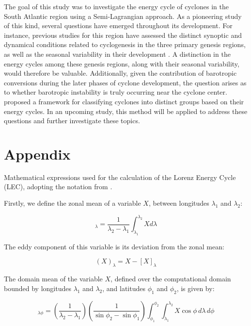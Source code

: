 \documentclass[pdflatex,sn-chicago]{sn-jnl}%
\theoremstyle{plain}
\theoremstyle{definition}
\theoremstyle{remark}
\theoremstyle{definition}
\begin{document}
The goal of this study was to investigate the energy cycle of cyclones in the South Atlantic region using a Semi-Lagrangian approach. As a pioneering study of this kind, several questions have emerged throughout its development. For instance, previous studies for this region have assessed the distinct synoptic and dynamical conditions related to cyclogenesis in the three primary genesis regions, as well as the seasonal variability in their development \citep{gramcianinov2019properties, crespo2021potential}. A distinction in the energy cycles among these genesis regions, along with their seasonal variability, would therefore be valuable. Additionally, given the contribution of barotropic conversions during the later phases of cyclone development, the question arises as to whether barotropic instability is truly occurring near the cyclone center. \citet{souza2024thesis} proposed a framework for classifying cyclones into distinct groups based on their energy cycles. In an upcoming study, this method will be applied to address these questions and further investigate these topics.


\backmatter



\section*{Appendix}


Mathematical expressions used for the calculation of the Lorenz Energy Cycle (LEC), adopting the notation from \citet{michaelides1987limited}. 


Firstly, we define the zonal mean of a variable $X$, between longitudes $\lambda_{1}$ and $\lambda_{2}$:

 \begin{equation}
     [X]_\lambda = \frac{1}{\lambda_2 - \lambda_1} \int_{\lambda_1}^{\lambda_2} X d\lambda
 \end{equation}

The eddy component of this variable is its deviation from the zonal mean:

\begin{equation}
    (X)_\lambda =  X - [X]_\lambda
\end{equation}

The domain mean of the variable $X$, defined over the computational domain bounded by longitudes $\lambda_1$ and $\lambda_2$, and latitudes $\phi_1$ and $\phi_2$, is given by:

\begin{equation}
    [X]_{\lambda\phi} = \left(\frac{1}{\lambda_2 - \lambda_1}\right)  \left(\frac{1}{\sin\phi_2 - \sin\phi_1}\right)  \int_{\phi_1}^{\phi_2} \int_{\lambda_1}^{\lambda_2} X \cos\phi\,d\lambda\,d\phi
\end{equation}
\end{document}
